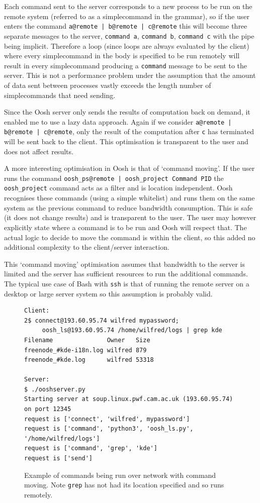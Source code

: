 \documentclass[12pt,twoside,notitlepage]{report}
\begin{document}
Each command sent to the server corresponds to a new process to be run
on the remote system (referred to as a simplecommand in the grammar),
so if the user enters the command {\tt a@remote | b@remote | c@remote}
this will become three separate messages to the server, {\tt command
  a}, {\tt command b}, {\tt command c} with the pipe being
implicit. Therefore a loop (since loops are always evaluated by the
client) where every simplecommand in the body is specified to be run
remotely will result in every simplecommand producing a {\tt command}
message to be sent to the server. This is not a performance problem
under the assumption that the amount of data sent between processes
vastly exceeds the length number of simplecommands that need sending.

Since the Oosh server only sends the results of computation back on
demand, it enabled me to use a lazy data approach. Again if we
consider {\tt a@remote | b@remote | c@remote}, only the result of the
computation after {\tt c} has terminated will be sent back to the
client. This optimisation is transparent to the user and does not
affect results.

A more interesting optimisation in Oosh is that of `command moving'. If
the user runs the command {\tt oosh\_ps@remote | oosh\_project Command
  PID} the {\tt oosh\_project} command acts as a filter and is
location independent. Oosh recognises these commands (using a simple
whitelist) and runs them on the same system as the previous command to
reduce bandwidth consumption. This is safe (it does not change
results) and is transparent to the user. The user may however
explicitly state where a command is to be run and Oosh will respect
that. The actual logic to decide to move the command is
within the client, so this added no additional complexity to the
client/server interaction. 

This `command moving' optimisation assumes that bandwidth to the
server is limited and the server has sufficient resources to run the
additional commands. The typical use case of Bash with {\tt ssh} is
that of running the remote server on a desktop or large server system
so this assumption is probably valid.

\begin{figure}
\begin{verbatim}
Client:
2$ connect@193.60.95.74 wilfred mypassword;
     oosh_ls@193.60.95.74 /home/wilfred/logs | grep kde
Filename               Owner   Size
freenode_#kde-i18n.log wilfred 879
freenode_#kde.log      wilfred 53318

Server:
$ ./ooshserver.py
Starting server at soup.linux.pwf.cam.ac.uk (193.60.95.74) on port 12345
request is ['connect', 'wilfred', mypassword']
request is ['command', 'python3', 'oosh_ls.py', '/home/wilfred/logs']
request is ['command', 'grep', 'kde']
request is ['send']
\end{verbatim}
\caption{Example of commands being run over network with command
  moving. Note {\tt grep} has not had its location specified and so
  runs remotely.}
\end{figure}
\end{document}
